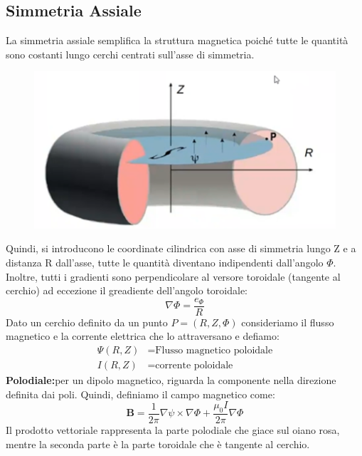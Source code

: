 \documentclass{article}
\begin{document}
\subsection{Simmetria Assiale}
La simmetria assiale semplifica la struttura magnetica poiché tutte le quantità sono costanti lungo cerchi centrati sull'asse di simmetria.
\begin{figure}
    \includegraphics[scale=0.4]{2022-06-26-15-20-02.png}%
\end{figure}
Quindi, si introducono le coordinate cilindrica con asse di simmetria lungo Z e a distanza R dall'asse, tutte le quantità diventano indipendenti dall'angolo \(\Phi \). Inoltre, tutti i gradienti sono perpendicolare al versore toroidale (tangente al cerchio) ad eccezione il greadiente dell'angolo toroidale:\begin{equation*}
    \nabla \Phi = \frac{e_{\Phi }}{R}
\end{equation*}
Dato un cerchio definito da un punto \(P=(R,Z,\Phi )\) consideriamo il flusso magnetico e la corrente elettrica che lo attraversano e defiamo:\begin{align*}
    \Psi(R,Z)&\text{=Flusso magnetico poloidale}\\
    I(R,Z)&\text{=corrente poloidale}
\end{align*}
\textbf{Polodiale:}per un dipolo magnetico, riguarda la componente nella direzione definita dai poli.
Quindi, definiamo il campo magnetico come:\begin{equation*}
    \mathbf{B}=\frac{1}{2\pi }\nabla\psi\times\nabla\Phi+\frac{\mu_{0}I}{2\pi }\nabla\Phi
\end{equation*}
Il prodotto vettoriale rappresenta la parte polodiale che giace sul oiano rosa, mentre la seconda parte è la parte toroidale che è tangente al cerchio.
\end{document}
